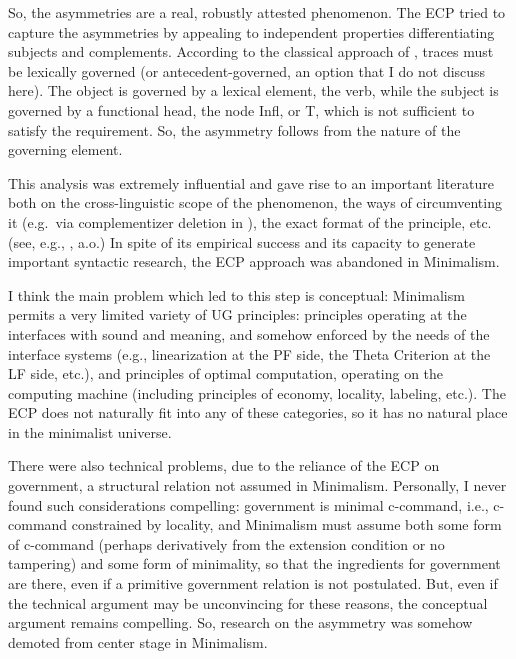 \documentclass[output=paper]{langsci/langscibook}
\begin{document}
\ea%
    \label{ex:key:21.3}
    \z
\z
%
So, the asymmetries are a real, robustly attested phenomenon. The \gls{ECP}
tried to capture the asymmetries by appealing to independent properties
differentiating subjects and complements. According to the classical approach
of \citet{Chomsky1981}, traces must be lexically governed (or
antecedent-governed, an option that I do not discuss here). The object is
governed by a lexical element, the verb, while the subject is governed by a
functional head, the node Infl, or T, which is not sufficient to satisfy the
requirement. So, the asymmetry follows from the nature of the governing
element.

This analysis was extremely influential and gave rise to an important
literature both on the cross-linguistic scope of the phenomenon, the ways of
circumventing it (e.g.\ via complementizer deletion in ), the exact
format of the principle, etc. (see, e.g.,
\citealt{Pesetsky1982,Kayne1984,Rizzi:1982,Rizzi1990}, a.o.) In spite of its
empirical success and its capacity to generate important syntactic research,
the \gls{ECP} approach was abandoned in Minimalism.

I think the main problem which led to this step is conceptual: Minimalism
permits a very limited variety of \gls{UG} principles:
principles operating at the interfaces with sound and meaning, and somehow
enforced by the needs of the interface systems (e.g., linearization at the
\gls{PF} side, the Theta Criterion at the LF side, etc.), and
principles of optimal computation, operating on the computing machine
(including principles of economy, locality, labeling, etc.). The
\gls{ECP} does not naturally fit into any of these
categories, so it has no natural place in the minimalist universe.

There were also technical problems, due to the reliance of the \gls{ECP} on
government, a structural relation not assumed in Minimalism. Personally, I
never found such considerations compelling: government is minimal c-command,
i.e., c-command constrained by locality, and Minimalism must assume both some
form of c-command (perhaps derivatively from the extension condition or no
tampering) and some form of minimality, so that the ingredients for government
are there, even if a primitive government relation is not postulated. But, even
if the technical argument may be unconvincing for these reasons, the conceptual
argument remains compelling. So, research on the asymmetry was somehow demoted
from center stage in Minimalism.
\end{document}
